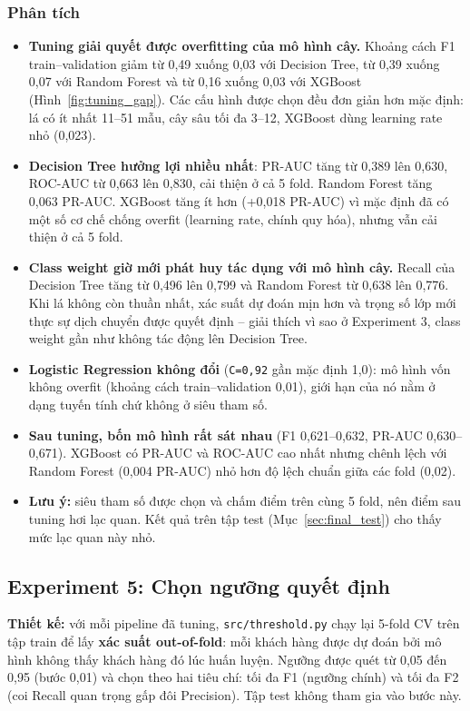 \subsubsection{Phân tích}
\begin{itemize}
    \item \textbf{Tuning giải quyết được overfitting của mô hình cây.} Khoảng cách F1 train--validation giảm từ 0,49 xuống 0,03 với Decision Tree, từ 0,39 xuống 0,07 với Random Forest và từ 0,16 xuống 0,03 với XGBoost (Hình~\ref{fig:tuning_gap}). Các cấu hình được chọn đều đơn giản hơn mặc định: lá có ít nhất 11--51 mẫu, cây sâu tối đa 3--12, XGBoost dùng learning rate nhỏ (0,023).
    \item \textbf{Decision Tree hưởng lợi nhiều nhất}: PR-AUC tăng từ 0,389 lên 0,630, ROC-AUC từ 0,663 lên 0,830, cải thiện ở cả 5 fold. Random Forest tăng 0,063 PR-AUC. XGBoost tăng ít hơn (+0,018 PR-AUC) vì mặc định đã có một số cơ chế chống overfit (learning rate, chính quy hóa), nhưng vẫn cải thiện ở cả 5 fold.
    \item \textbf{Class weight giờ mới phát huy tác dụng với mô hình cây.} Recall của Decision Tree tăng từ 0,496 lên 0,799 và Random Forest từ 0,638 lên 0,776. Khi lá không còn thuần nhất, xác suất dự đoán mịn hơn và trọng số lớp mới thực sự dịch chuyển được quyết định -- giải thích vì sao ở Experiment 3, class weight gần như không tác động lên Decision Tree.
    \item \textbf{Logistic Regression không đổi} (\texttt{C=0,92} gần mặc định 1,0): mô hình vốn không overfit (khoảng cách train--validation 0,01), giới hạn của nó nằm ở dạng tuyến tính chứ không ở siêu tham số.
    \item \textbf{Sau tuning, bốn mô hình rất sát nhau} (F1 0,621--0,632, PR-AUC 0,630--0,671). XGBoost có PR-AUC và ROC-AUC cao nhất nhưng chênh lệch với Random Forest (0,004 PR-AUC) nhỏ hơn độ lệch chuẩn giữa các fold (0,02).
    \item \textbf{Lưu ý:} siêu tham số được chọn và chấm điểm trên cùng 5 fold, nên điểm sau tuning hơi lạc quan. Kết quả trên tập test (Mục~\ref{sec:final_test}) cho thấy mức lạc quan này nhỏ.
\end{itemize}

\subsection{Experiment 5: Chọn ngưỡng quyết định}
\textbf{Thiết kế:} với mỗi pipeline đã tuning, \texttt{src/threshold.py} chạy lại 5-fold CV trên tập train để lấy \textbf{xác suất out-of-fold}: mỗi khách hàng được dự đoán bởi mô hình không thấy khách hàng đó lúc huấn luyện. Ngưỡng được quét từ 0,05 đến 0,95 (bước 0,01) và chọn theo hai tiêu chí: tối đa F1 (ngưỡng chính) và tối đa F2 (coi Recall quan trọng gấp đôi Precision). Tập test không tham gia vào bước này.

